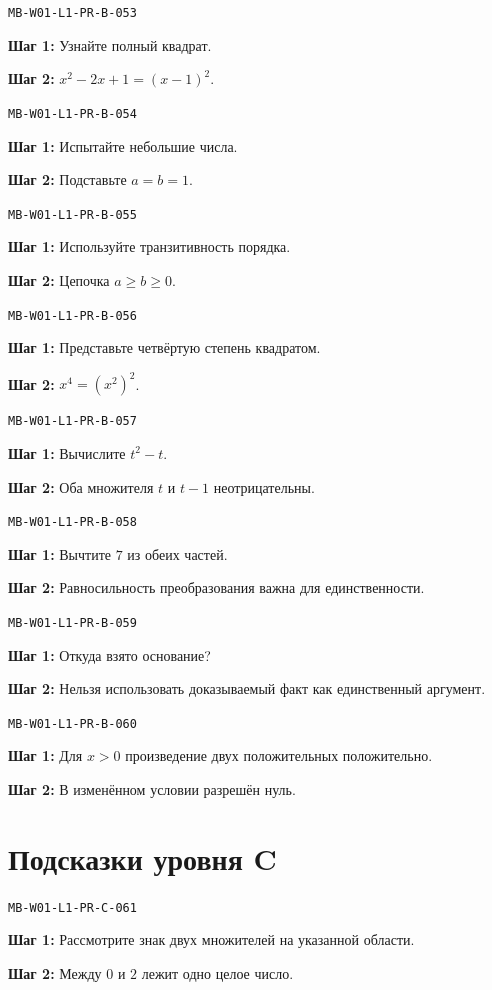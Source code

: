 \documentclass[11pt,a4paper,openany]{book}
\newcommand{\muid}[1]{\texttt{\footnotesize #1}}
\begin{document}
\noindent\muid{MB-W01-L1-PR-B-053}\par 
\textbf{Шаг 1:} Узнайте полный квадрат.\par \textbf{Шаг 2:} $x^2-2x+1=(x-1)^2$.\smallskip

\noindent\muid{MB-W01-L1-PR-B-054}\par 
\textbf{Шаг 1:} Испытайте небольшие числа.\par \textbf{Шаг 2:} Подставьте $a=b=1$.\smallskip

\noindent\muid{MB-W01-L1-PR-B-055}\par 
\textbf{Шаг 1:} Используйте транзитивность порядка.\par \textbf{Шаг 2:} Цепочка $a\ge b\ge0$.\smallskip

\noindent\muid{MB-W01-L1-PR-B-056}\par 
\textbf{Шаг 1:} Представьте четвёртую степень квадратом.\par \textbf{Шаг 2:} $x^4=(x^2)^2$.\smallskip

\noindent\muid{MB-W01-L1-PR-B-057}\par 
\textbf{Шаг 1:} Вычислите $t^2-t$.\par \textbf{Шаг 2:} Оба множителя $t$ и $t-1$ неотрицательны.\smallskip

\noindent\muid{MB-W01-L1-PR-B-058}\par 
\textbf{Шаг 1:} Вычтите $7$ из обеих частей.\par \textbf{Шаг 2:} Равносильность преобразования важна для единственности.\smallskip

\noindent\muid{MB-W01-L1-PR-B-059}\par 
\textbf{Шаг 1:} Откуда взято основание?\par \textbf{Шаг 2:} Нельзя использовать доказываемый факт как единственный аргумент.\smallskip

\noindent\muid{MB-W01-L1-PR-B-060}\par 
\textbf{Шаг 1:} Для $x>0$ произведение двух положительных положительно.\par \textbf{Шаг 2:} В изменённом условии разрешён нуль.\smallskip

\section{Подсказки уровня C}

\noindent\muid{MB-W01-L1-PR-C-061}\par 
\textbf{Шаг 1:} Рассмотрите знак двух множителей на указанной области.\par \textbf{Шаг 2:} Между $0$ и $2$ лежит одно целое число.\smallskip
\end{document}
